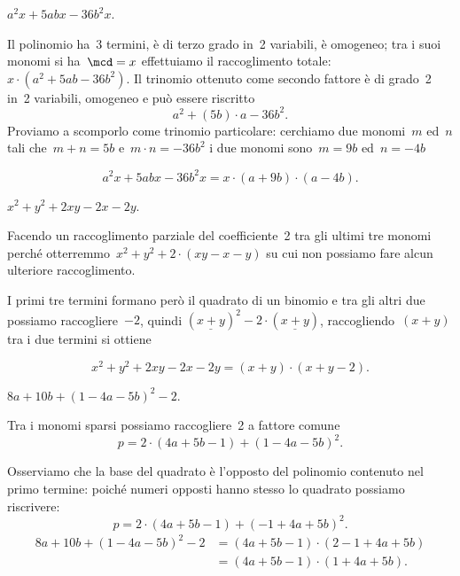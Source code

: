\begin{exrig}
 \begin{esempio}
 $a^{2}x+5abx-36b^{2}x$.

Il polinomio ha~3 termini, è di terzo grado in~2 variabili, è omogeneo;
tra i suoi monomi si ha~$\mcd= x$ effettuiamo il raccoglimento
totale:~$x\cdot\left(a^{2}+5ab-36b^{2}\right)$.
Il trinomio ottenuto come secondo fattore è di grado~2 in~2 variabili,
omogeneo e può essere riscritto
\[a^{2}+\left(5b\right)\cdot a-36b^{2}.\]
Proviamo a scomporlo come trinomio particolare:
cerchiamo due monomi~$m$ ed~$n$ tali che~$m+n=5b$
e~$m\cdot n=-36b^{2}$ i due monomi sono~$m=9b$
ed~$n=-4b$

\[a^{2}x+5abx-36b^{2}x=x\cdot\left(a+9b\right)\cdot \left(a-4b\right).\]
 \end{esempio}

 \begin{esempio}
 $x^{2}+y^{2}+2xy-2x-2y$.

Facendo un raccoglimento parziale del coefficiente~2 tra gli ultimi tre monomi 
perché otterremmo~$x^{2}+y^{2}+2\cdot\left(xy-x-y\right)$ su cui non possiamo
fare alcun ulteriore raccoglimento.

I primi tre termini formano però il quadrato di un binomio e tra gli
altri due possiamo raccogliere~$-2$, quindi
$\left(\underline{{x+y}}\right)^{2}-2\cdot\left(\underline{{x+y}}\right)$,
raccogliendo~$(x + y)$ tra i due termini si ottiene

\begin{equation*}
x^{2}+y^{2}+2xy-2x-2y=\left(x+y\right)\cdot \left(x+y-2\right).
\end{equation*}
 \end{esempio}

 \begin{esempio}
 $8a+10b+\left(1-4a-5b\right)^{2}-2$.

Tra i monomi sparsi possiamo raccogliere~2 a fattore comune
\[p=2\cdot \left(4a+5b-1\right)+\left(1-4a-5b\right)^{2}.\]

Osserviamo che la base del quadrato è l'opposto del polinomio contenuto
nel primo termine: poiché numeri opposti hanno
stesso lo quadrato possiamo riscrivere:
\[p=2\cdot\left(4a+5b-1\right)+\left(-1+4a+5b\right)^{2}.\]
\begin{align*}
8a+10b+(1-4a-5b)^{2}-2&=\left(4a+5b-1\right)\cdot\left(2-1+4a+5b\right)\\
&=\left(4a+5b-1\right)\cdot\left(1+4a+5b\right).
\end{align*}
 \end{esempio}


\end{exrig}
